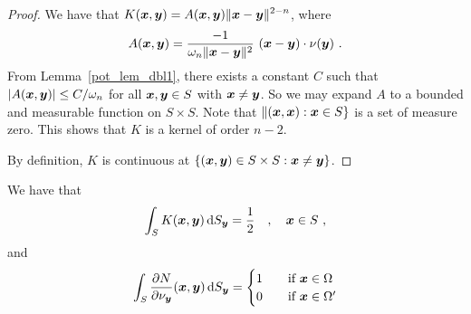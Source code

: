 \begin{proof}
We have that $\displaystyle K({\bm{x}},{\bm{y}}) = A({\bm{x}},{\bm{y}})
\|{\bm{x}}- {\bm{y}}\|^{2-n}$, where
\[
A({\bm{x}},{\bm{y}}) = \frac{-1}{\omega_n \|{\bm{x}}-{\bm{y}}\|^2}\,
\left({\bm{x}}-{\bm{y}}\right)\cdot \nu({\bm{y}}) \  .
\]
From Lemma~\ref{pot_lem_dbl1}, there exists a constant $C$ such that
$\displaystyle \left| A({\bm{x}},{\bm{y}})\right| \leq C/\omega_n$ for
all ${\bm{x}},{\bm{y}} \in S$ with ${\bm{x}} \neq {\bm{y}}$.
So we may expand $A$ to a bounded and measurable function
on $S \times S$.  Note that $\|({\bm{x}},{\bm{x}}) : {\bm{x}} \in S\}$
is a set of measure zero.  This shows that $K$ is a kernel of order
$n-2$.

By definition, $K$ is continuous at
$\{ ({\bm{x}},{\bm{y}}) \in S \times S : {\bm{x}} \neq {\bm{y}}\}$.
\end{proof}

\begin{lemma} \label{pot_lem_dbl3}
We have that
\begin{equation} \label{pot_lem_dbl3E1}
\int_S K({\bm{x}},{\bm{y}}) \,\mathrm{d}{S}_{{\bm{y}}} = \frac{1}{2} \quad , \quad
{\bm{x}} \in S \ ,
\end{equation}
and
\begin{equation} \label{pot_lem_dbl3E2}
\int_S \frac{\partial{N}}{\partial \nu_{{\bm{y}}}}({\bm{x}},{\bm{y}}) \,\mathrm{d}{S}_{{\bm{y}}} =
\begin{cases}
1 & \quad \text{if} \ {\bm{x}} \in \Omega \\
0 & \quad \text{if} \ {\bm{x}} \in \Omega^{\prime}
\end{cases}
\end{equation}
\end{lemma}

